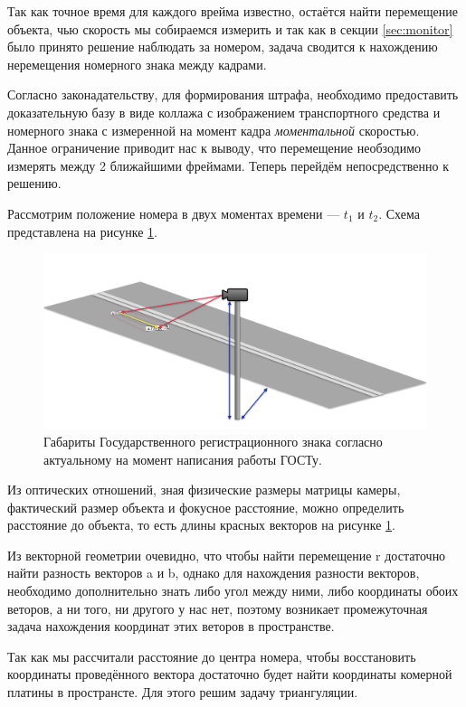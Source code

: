 \documentclass[specification,annotation,times]{itmo-student-thesis}
\begin{document}
	Так как точное время для каждого врейма известно, остаётся найти перемещение объекта, чью скорость мы собираемся измерить и так как в секции \ref{sec:monitor} было принято решение наблюдать за номером, задача сводится к нахождению неремещения номерного знака между кадрами.
	
	Согласно законадательству, для формирования штрафа, необходимо предоставить доказательную базу в виде коллажа с изображением транспортного средства и номерного знака с измеренной на момент кадра \textit{моментальной} скоростью. Данное ограничение приводит нас к выводу, что перемещение необзодимо измерять между 2 ближайшими фреймами. Теперь перейдём непосредственно к решению.
	
	Рассмотрим положение номера в двух моментах времени --- $ t_1 $ и $ t_2 $. Схема представлена на рисунке \ref{img:r-scheme}.
	
	\begin{figure}[!ht]
		\caption{Габариты Государственного регистрационного знака согласно актуальному на момент написания работы ГОСТу.}\label{img:r-scheme}
		\includegraphics[width=0.85\linewidth]{../png/r_scheme.png}
		\centering
	\end{figure}
	
	Из оптических отношений, зная физические размеры матрицы камеры, фактический размер объекта и фокусное расстояние, можно определить расстояние до объекта, то есть длины красных векторов на рисунке \ref{img:r-scheme}. 
	
	Из векторной геометрии очевидно, что чтобы найти перемещение r достаточно найти разность векторов a и b, однако для нахождения разности векторов, необходимо дополнительно знать либо угол между ними, либо координаты обоих веторов, а ни того, ни другого у нас нет, поэтому возникает промежуточная задача нахождения координат этих веторов в пространстве.
	
	Так как мы рассчитали расстояние до центра номера, чтобы восстановить координаты проведённого вектора достаточно будет найти координаты комерной платины в пространсте. Для этого решим задачу триангуляции.
	
\end{document}
